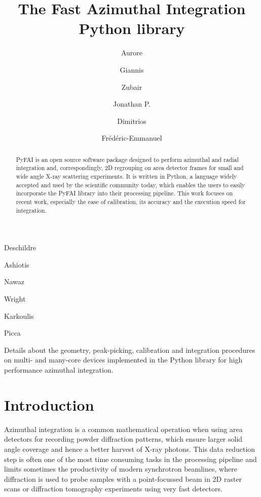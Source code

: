 \documentclass[preprint]{iucr}
\begin{document}
\title{The Fast Azimuthal Integration Python library}

    \author[a]{Aurore}{Deschildre}
    \author[a]{Giannis}{Ashiotis}
    \author[b]{Zubair}{Nawaz}
    \author[a]{Jonathan P.}{Wright}
    \author[a]{Dimitrios}{Karkoulis}
    \author[c]{Fr\'ed\'eric-Emmanuel}{Picca}


\maketitle

\begin{synopsis}
Details about the geometry, peak-picking, calibration and integration procedures
on multi- and many-core devices implemented in the Python library for high
performance azimuthal integration.
\end{synopsis}

\begin{abstract}
PyFAI is an open source software package designed to perform azimuthal and
radial integration and, correspondingly, 2D regrouping on area detector frames for small and wide
angle X-ray scattering experiments.
It is written in Python, a language widely accepted and used by the scientific
community today, which enables the users to easily incorporate the PyFAI
library into their processing pipeline.
This work focuses on recent work, especially the ease of
calibration, its accuracy and the execution speed for integration.
\end{abstract}

\section{Introduction}

Azimuthal integration is a common mathematical operation when using area
detectors for recording powder diffraction patterns, which  ensure larger solid
angle coverage and hence a better harvest of X­-ray photons.
This data reduction step is often one of the most time ­consuming tasks in the
processing pipeline and limits sometimes the productivity of modern synchrotron
beamlines, where diffraction is used to probe samples with a point-focussed
beam in 2D raster scans or diffraction tomography experiments using
very fast detectors.
\end{document}
